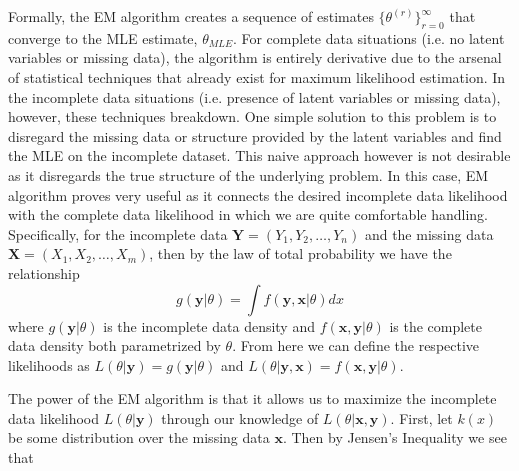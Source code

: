\documentclass{article}
\begin{document}
Formally, the EM algorithm creates a sequence of estimates $\{\theta^{(r)}\}_{r=0}^{\infty}$ that converge to the MLE estimate, $\theta_{MLE}$. For complete data situations (i.e. no latent variables or missing data), the algorithm is entirely derivative due to the arsenal of statistical techniques that already exist for maximum likelihood estimation. In the incomplete data situations (i.e. presence of latent variables or missing data), however, these techniques breakdown. One simple solution to this problem is to disregard the missing data or structure provided by the latent variables and find the MLE on the incomplete dataset. This naive approach however is not desirable as it disregards the true structure of the underlying problem. In this case, EM algorithm proves very useful as it connects the desired incomplete data likelihood with the complete data likelihood in which we are quite comfortable handling. Specifically, for the incomplete data $\mathbf{Y} = (Y_1, Y_2, \ldots, Y_n)$ and the missing data $\mathbf{X} = (X_1, X_2, \ldots, X_m)$, then by the law of total probability we have the relationship $$g(\mathbf{y}|\theta) = \int f(\mathbf{y}, \mathbf{x}|\theta)dx$$ where $g(\mathbf{y}|\theta)$ is the incomplete data density and $f(\mathbf{x},\mathbf{y}|\theta)$ is the complete data density both parametrized by $\theta$. From here we can define the respective likelihoods as $L(\theta|\mathbf{y}) = g(\mathbf{y}|\theta)$ and $L(\theta|\mathbf{y}, \mathbf{x}) = f(\mathbf{x},\mathbf{y}|\theta)$. 

The power of the EM algorithm is that it allows us to maximize the incomplete data likelihood $L(\theta|\mathbf{y})$ through our knowledge of $L(\theta|\mathbf{x}, \mathbf{y})$. First, let $k(x)$ be some distribution over the missing data $\mathbf{x}$. Then by Jensen's Inequality we see that 
\end{document}
